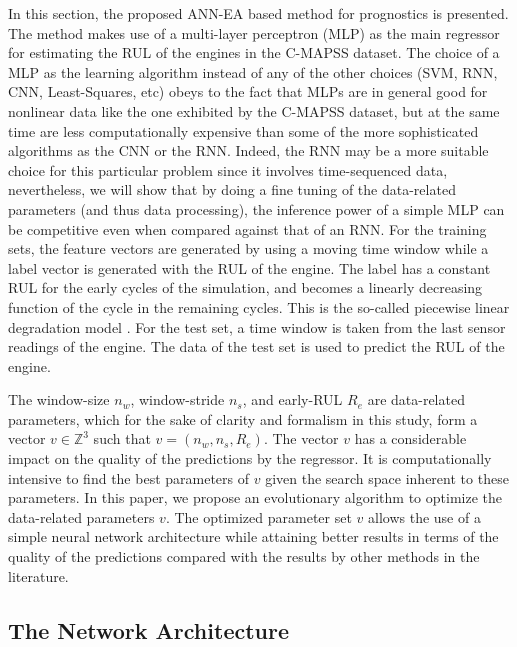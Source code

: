 \documentclass[preprint,12pt]{elsarticle}%
\begin{document}
\label{sec:method}

In this section, the proposed ANN-EA based method for prognostics is
presented. The method makes use of a multi-layer perceptron (MLP) as the main
regressor for estimating the RUL of the engines in the C-MAPSS dataset. The choice of a MLP as the learning algorithm instead of any of the other choices (SVM, RNN, CNN, Least-Squares, etc) obeys to the fact that MLPs are in general good for nonlinear data like the one exhibited by the C-MAPSS dataset, but at the same time are less computationally expensive than some of the more sophisticated algorithms as the CNN or the RNN. Indeed, the RNN may be a more suitable choice for this particular problem since it involves time-sequenced data, nevertheless, we will show that by doing a fine tuning of the data-related parameters (and thus data processing), the inference power of a simple MLP can be competitive even when compared against that of an RNN.  
For the training sets, the feature vectors are generated by using a moving time window
while a label vector is generated with the RUL of the engine. The label has a
constant RUL for the early cycles of the simulation, and becomes a linearly
decreasing function of the cycle in the remaining cycles. This is the
so-called piecewise linear degradation model \cite{Ramasso2014}. For the test
set, a time window is taken from the last sensor readings of the engine. The
data of the test set is used to predict the RUL of the engine.

The window-size $n_{w}$, window-stride $n_{s}$, and early-RUL $R_{e}$ are
data-related parameters, which for the sake of clarity and formalism in this
study, form a vector $v \in\mathbb{Z}^{3}$ such that $v = (n_{w}, n_{s},
R_{e})$. The vector $v$ has a considerable impact on the quality of the
predictions by the regressor. It is computationally intensive to find the best
parameters of $v$ given the search space inherent to these parameters. In this
paper, we propose an evolutionary algorithm to optimize the data-related
parameters $v$. The optimized parameter set $v$ allows the use of a simple
neural network architecture while attaining better results in terms of the
quality of the predictions compared with the results by other methods in the literature.

\subsection{The Network Architecture}
\end{document}
